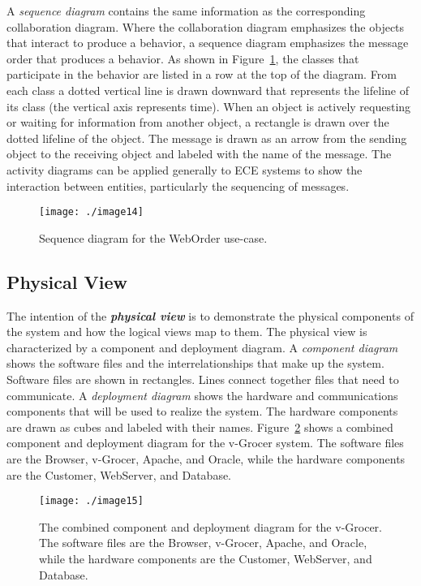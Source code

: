 A \emph{sequence diagram} contains the same information as the
corresponding collaboration diagram. Where the collaboration diagram
emphasizes the objects that interact to produce a behavior, a sequence
diagram emphasizes the message order that produces a behavior. As shown
in Figure~\ref{figure:sequenceDiagramWebOrder}, 
the classes that participate in the behavior are listed
in a row at the top of the diagram. From each class a dotted vertical
line is drawn downward that represents the lifeline of its class (the
vertical axis represents time). When an object is actively requesting or
waiting for information from another object, a rectangle is drawn over
the dotted lifeline of the object. The message is drawn as an arrow from
the sending object to the receiving object and labeled with the name of
the message. The activity diagrams can be applied generally to ECE
systems to show the interaction between entities, particularly the
sequencing of messages.

\begin{figure}
\texttt{[image: ./image14]}
\caption{Sequence diagram for the WebOrder use-case.}
\label{figure:sequenceDiagramWebOrder}
\end{figure}

\subsection{Physical View}
\label{subsection:physical-view}

The intention of the \emph{\textbf{physical view}} is to demonstrate the
physical components of the system and how the logical views map to them.
The physical view is characterized by a component and deployment
diagram. A \emph{component diagram} shows the software files and the
interrelationships that make up the system. Software files are shown in
rectangles. Lines connect together files that need to communicate. A
\emph{deployment diagram} shows the hardware and communications
components that will be used to realize the system. The hardware
components are drawn as cubes and labeled with their names. 
Figure~\ref{figure:vGrocerSystem}
shows a combined component and deployment diagram for the v-Grocer
system. The software files are the Browser, v-Grocer, Apache, and
Oracle, while the hardware components are the Customer, WebServer, and
Database.

\begin{figure}
\texttt{[image: ./image15]}
\caption{The combined component and deployment diagram for
the v-Grocer. The software files are the Browser, v-Grocer, Apache, and
Oracle, while the hardware components are the Customer, WebServer, and
Database.}
\label{figure:vGrocerSystem}
\end{figure}


